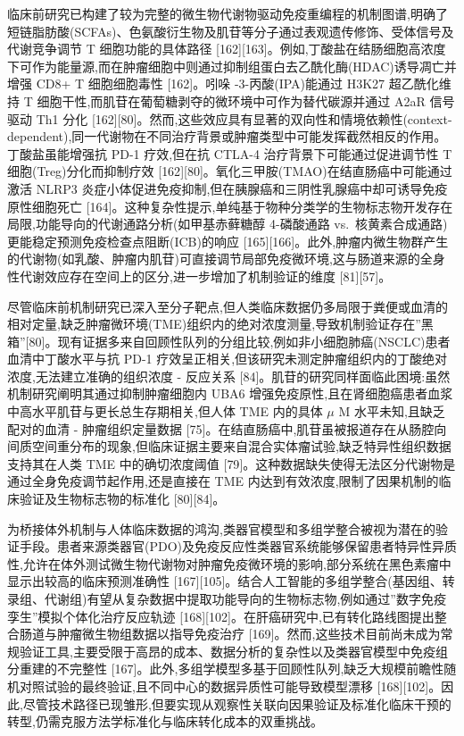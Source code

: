 \documentclass[11pt]{article}
\begin{document}
临床前研究已构建了较为完整的微生物代谢物驱动免疫重编程的机制图谱,明确了短链脂肪酸(SCFAs)、色氨酸衍生物及肌苷等分子通过表观遗传修饰、受体信号及代谢竞争调节 T 细胞功能的具体路径 {[}162{]}{[}163{]}。例如,丁酸盐在结肠细胞高浓度下可作为能量源,而在肿瘤细胞中则通过抑制组蛋白去乙酰化酶(HDAC)诱导凋亡并增强 CD8+ T 细胞细胞毒性 {[}162{]}。吲哚 -3-丙酸(IPA)能通过 H3K27 超乙酰化维持 T 细胞干性,而肌苷在葡萄糖剥夺的微环境中可作为替代碳源并通过 A2aR 信号驱动 Th1 分化 {[}162{]}{[}80{]}。然而,这些效应具有显著的双向性和情境依赖性(context-dependent),同一代谢物在不同治疗背景或肿瘤类型中可能发挥截然相反的作用。丁酸盐虽能增强抗 PD-1 疗效,但在抗 CTLA-4 治疗背景下可能通过促进调节性 T 细胞(Treg)分化而抑制疗效 {[}162{]}{[}80{]}。氧化三甲胺(TMAO)在结直肠癌中可能通过激活 NLRP3 炎症小体促进免疫抑制,但在胰腺癌和三阴性乳腺癌中却可诱导免疫原性细胞死亡 {[}164{]}。这种复杂性提示,单纯基于物种分类学的生物标志物开发存在局限,功能导向的代谢通路分析(如甲基赤藓糖醇 4-磷酸通路 vs.~核黄素合成通路)更能稳定预测免疫检查点阻断(ICB)的响应 {[}165{]}{[}166{]}。此外,肿瘤内微生物群产生的代谢物(如乳酸、肿瘤内肌苷)可直接调节局部免疫微环境,这与肠道来源的全身性代谢效应存在空间上的区分,进一步增加了机制验证的维度 {[}81{]}{[}57{]}。

尽管临床前机制研究已深入至分子靶点,但人类临床数据仍多局限于粪便或血清的相对定量,缺乏肿瘤微环境(TME)组织内的绝对浓度测量,导致机制验证存在''黑箱''{[}80{]}。现有证据多来自回顾性队列的分组比较,例如非小细胞肺癌(NSCLC)患者血清中丁酸水平与抗 PD-1 疗效呈正相关,但该研究未测定肿瘤组织内的丁酸绝对浓度,无法建立准确的组织浓度 - 反应关系 {[}84{]}。肌苷的研究同样面临此困境:虽然机制研究阐明其通过抑制肿瘤细胞内 UBA6 增强免疫原性,且在肾细胞癌患者血浆中高水平肌苷与更长总生存期相关,但人体 TME 内的具体 \(\mu\) M 水平未知,且缺乏配对的血清 - 肿瘤组织定量数据 {[}75{]}。在结直肠癌中,肌苷虽被报道存在从肠腔向间质空间重分布的现象,但临床证据主要来自混合实体瘤试验,缺乏特异性组织数据支持其在人类 TME 中的确切浓度阈值 {[}79{]}。这种数据缺失使得无法区分代谢物是通过全身免疫调节起作用,还是直接在 TME 内达到有效浓度,限制了因果机制的临床验证及生物标志物的标准化 {[}80{]}{[}84{]}。

为桥接体外机制与人体临床数据的鸿沟,类器官模型和多组学整合被视为潜在的验证手段。患者来源类器官(PDO)及免疫反应性类器官系统能够保留患者特异性异质性,允许在体外测试微生物代谢物对肿瘤免疫微环境的影响,部分系统在黑色素瘤中显示出较高的临床预测准确性 {[}167{]}{[}105{]}。结合人工智能的多组学整合(基因组、转录组、代谢组)有望从复杂数据中提取功能导向的生物标志物,例如通过''数字免疫孪生''模拟个体化治疗反应轨迹 {[}168{]}{[}102{]}。在肝癌研究中,已有转化路线图提出整合肠道与肿瘤微生物组数据以指导免疫治疗 {[}169{]}。然而,这些技术目前尚未成为常规验证工具,主要受限于高昂的成本、数据分析的复杂性以及类器官模型中免疫组分重建的不完整性 {[}167{]}。此外,多组学模型多基于回顾性队列,缺乏大规模前瞻性随机对照试验的最终验证,且不同中心的数据异质性可能导致模型漂移 {[}168{]}{[}102{]}。因此,尽管技术路径已现雏形,但要实现从观察性关联向因果验证及标准化临床干预的转型,仍需克服方法学标准化与临床转化成本的双重挑战。
\end{document}
